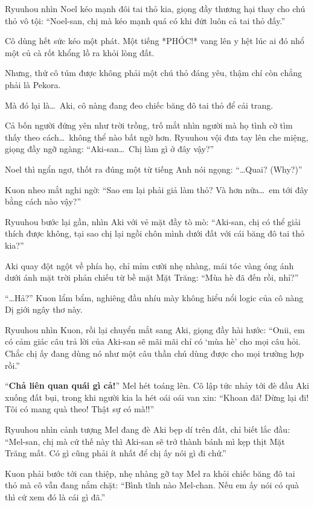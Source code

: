 \documentclass[../main.tex]{subfiles}
\begin{document}
Ryuuhou nhìn Noel kéo mạnh đôi tai thỏ kia, giọng đầy thương hại thay cho chú thỏ vô tội: ``Noel-san, chị mà kéo mạnh quá có khi đứt luôn cả tai thỏ đấy.''

Cô dùng hết sức kéo một phát. Một tiếng *PHÓC!* vang lên y hệt lúc ai đó nhổ một củ cà rốt khổng lồ ra khỏi lòng đất.

Nhưng, thứ cô túm được không phải một chú thỏ đáng yêu, thậm chí còn chẳng phải là Pekora.

Mà đó lại là\dots\ Aki, cô nàng đang đeo chiếc băng đô tai thỏ để cải trang.


Cả bốn người đứng yên như trời trồng, trố mắt nhìn người mà họ tình cờ tìm thấy theo cách\dots\ không thể nào bất ngờ hơn. Ryuuhou vội đưa tay lên che miệng, giọng đầy ngỡ ngàng: ``Aki-san\dots\ Chị làm gì ở đây vậy?''

Noel thì ngẩn ngơ, thốt ra đúng một từ tiếng Anh nói ngọng: ``\dots Quai? (Why?)''

Kuon nheo mắt nghi ngờ: ``Sao em lại phải giả làm thỏ? Và hơn nữa\dots\ em tới đây bằng cách nào vậy?''

Ryuuhou bước lại gần, nhìn Aki với vẻ mặt đầy tò mò: ``Aki-san, chị có thể giải thích được không, tại sao chị lại ngồi chôn mình dưới đất với cái băng đô tai thỏ kia?''

Aki quay đột ngột về phía họ, chỉ mỉm cười nhẹ nhàng, mái tóc vàng óng ánh dưới ánh mặt trời phản chiếu từ bề mặt Mặt Trăng: ``Mùa hè đã đến rồi, nhỉ?''

``\dots Hả?'' Kuon lẩm bẩm, nghiêng đầu nhíu mày không hiểu nổi logic của cô nàng Dị giới ngây thơ này.

Ryuuhou nhìn Kuon, rồi lại chuyển mắt sang Aki, giọng đầy hài hước: ``Onii, em có cảm giác câu trả lời của Aki-san sẽ mãi mãi chỉ có `mùa hè' cho mọi câu hỏi. Chắc chị ấy đang dùng nó như một câu thần chú dùng được cho mọi trường hợp rồi.''

``\textbf{Chả liên quan quái gì cả!}'' Mel hét toáng lên. Cô lập tức nhảy tới đè đầu Aki xuống đất bụi, trong khi người kia la hét oái oái van xin: ``Khoan đã! Dừng lại đi! Tôi có mang quà theo! Thật sự có mà!!''

Ryuuhou nhìn cảnh tượng Mel đang đè Aki bẹp dí trên đất, chỉ biết lắc đầu: ``Mel-san, chị mà cứ thế này thì Aki-san sẽ trở thành bánh mì kẹp thịt Mặt Trăng mất. Có gì cũng phải ít nhất để chị ấy nói gì đi chứ.''

Kuon phải bước tới can thiệp, nhẹ nhàng gỡ tay Mel ra khỏi chiếc băng đô tai thỏ mà cô vẫn đang nắm chặt: ``Bình tĩnh nào Mel-chan. Nếu em ấy nói có quà thì cứ xem đó là cái gì đã.''
\end{document}
